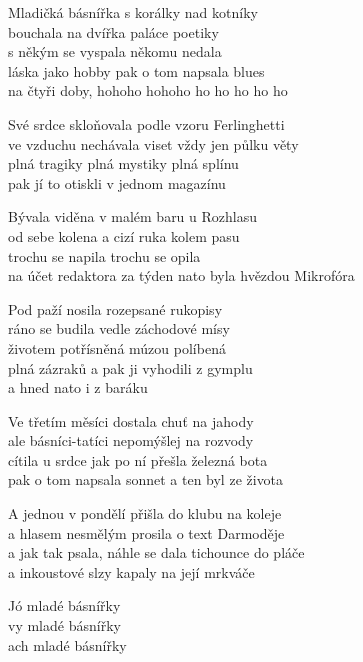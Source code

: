 
\ve{}
Mladičká básnířka s korálky nad kotníky\\
bouchala na dvířka paláce poetiky\\
s někým se vyspala někomu nedala\\
láska jako hobby pak o tom napsala blues\\
na čtyři doby, hohoho hohoho ho ho ho ho ho

\ve{}
Své srdce skloňovala podle vzoru Ferlinghetti\\
ve vzduchu nechávala viset vždy jen půlku věty\\
plná tragiky plná mystiky plná splínu\\
pak jí to otiskli v jednom magazínu

\ve{}
Bývala viděna v malém baru u Rozhlasu\\
od sebe kolena a cizí ruka kolem pasu\\
trochu se napila trochu se opila\\
na účet redaktora za týden nato byla hvězdou Mikrofóra

\ve{}
Pod paží nosila rozepsané rukopisy\\
ráno se budila vedle záchodové mísy\\
životem potřísněná múzou políbená\\
plná zázraků a pak ji vyhodili z gymplu\\
a hned nato i z baráku 

\ve{}
Ve třetím měsíci dostala chuť na jahody\\
ale básníci-tatíci nepomýšlej na rozvody\\
cítila u srdce jak po ní přešla železná bota\\
pak o tom napsala sonnet a ten byl ze života

A jednou v pondělí přišla do klubu na koleje\\
a hlasem nesmělým prosila o text Darmoděje\\
a jak tak psala, náhle se dala tichounce do pláče\\
a inkoustové slzy kapaly na její mrkváče

Jó mladé básnířky\\
vy mladé básnířky\\
ach mladé básnířky

\esong{}